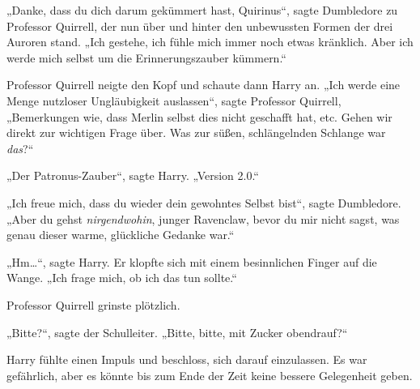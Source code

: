 „Danke, dass du dich darum gekümmert hast, Quirinus“, sagte Dumbledore zu Professor Quirrell, der nun über und hinter den unbewussten Formen der drei Auroren stand. „Ich gestehe, ich fühle mich immer noch etwas kränklich. Aber ich werde mich selbst um die Erinnerungszauber kümmern.“

Professor Quirrell neigte den Kopf und schaute dann Harry an. „Ich werde eine Menge nutzloser Ungläubigkeit auslassen“, sagte Professor Quirrell, „Bemerkungen wie, dass Merlin selbst dies nicht geschafft hat, etc. Gehen wir direkt zur wichtigen Frage über. Was zur süßen, schlängelnden Schlange war \emph{das}?“

„Der Patronus-Zauber“, sagte Harry. „Version 2.0.“

„Ich freue mich, dass du wieder dein gewohntes Selbst bist“, sagte Dumbledore. „Aber du gehst \emph{nirgendwohin}, junger Ravenclaw, bevor du mir nicht sagst, was genau dieser warme, glückliche Gedanke war.“

„Hm…“, sagte Harry. Er klopfte sich mit einem besinnlichen Finger auf die Wange. „Ich frage mich, ob ich das tun sollte.“

Professor Quirrell grinste plötzlich.

„Bitte?“, sagte der Schulleiter. „Bitte, bitte, mit Zucker obendrauf?“

Harry fühlte einen Impuls und beschloss, sich darauf einzulassen. Es war gefährlich, aber es könnte bis zum Ende der Zeit keine bessere Gelegenheit geben.

